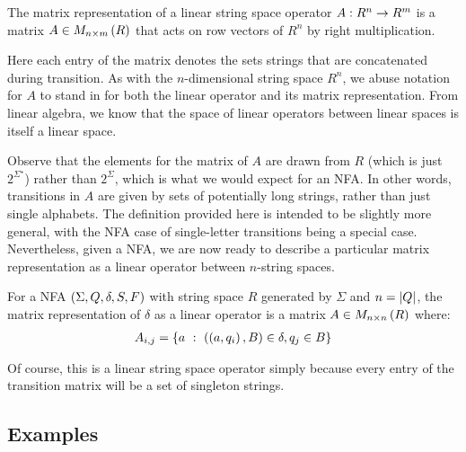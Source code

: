 \begin{definition}
  The matrix representation of a linear string space operator
  \(A : R^n \to R^m\) is a matrix
  \(A \in M_{n \times m} \left(R\right)\) that
  acts on row vectors of \(R^n\) by right multiplication.
\end{definition}

Here each entry of the matrix denotes the sets strings that are
concatenated during transition.
As with the \(n\)-dimensional string space \(R^n\),
we abuse notation for \(A\) to stand in for
both the linear operator and its matrix representation.
From linear algebra, we know that the space of linear operators between
linear spaces is itself a linear space.

Observe that the elements for the matrix of \(A\) are drawn from
\(R\) (which is just \(2^{\Sigma^\star}\))
rather than \(2^{\Sigma}\),
which is what we would expect for an NFA.
In other words, transitions in \(A\) are given by sets of potentially
long strings, rather than just single alphabets.
The definition provided here is intended to be slightly more general,
with the NFA case of single-letter transitions being a special case.
Nevertheless,
given a NFA, we are now ready to describe a particular matrix representation
as a linear operator between \(n\)-string spaces.

\begin{definition}
  For a NFA \(\left(\Sigma, Q, \delta, S, F\right)\) with
  string space \(R\) generated by \(\Sigma\) and \(n = \left\lvert Q\right\rvert\),
  the matrix representation of \(\delta\) as a linear operator
  is a matrix
  \(A \in M_{n \times n} \left(R\right)\)  where:
  \begin{align*}
    A_{i, j}
      = \left\{a \  : \  \left(\left(a, q_i\right), B\right) \in \delta, q_j \in B\right\}
  \end{align*}
\end{definition}

Of course, this is a linear string space operator simply because
every entry of the transition matrix will be a set of singleton strings.



\subsection{Examples}

